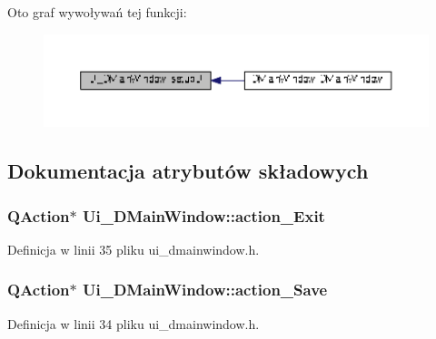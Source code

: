 Oto graf wywoływań tej funkcji\+:
\nopagebreak
\begin{figure}[H]
\begin{center}
\leavevmode
\includegraphics[width=350pt]{class_ui___d_main_window_aa53f3a89bf520704a3e79037df2fd451_icgraph}
\end{center}
\end{figure}




\subsection{Dokumentacja atrybutów składowych}
\hypertarget{class_ui___d_main_window_a00e6b795743b676bdf3ed853e91f7029}{}
\subsubsection[{action\+\_\+\+Exit}]{\setlength{\rightskip}{0pt plus 5cm}Q\+Action$\ast$ Ui\+\_\+\+D\+Main\+Window\+::action\+\_\+\+Exit}\label{class_ui___d_main_window_a00e6b795743b676bdf3ed853e91f7029}


Definicja w linii 35 pliku ui\+\_\+dmainwindow.\+h.

\hypertarget{class_ui___d_main_window_a7ab98279e07bdd724a091ea06012c87b}{}
\subsubsection[{action\+\_\+\+Save}]{\setlength{\rightskip}{0pt plus 5cm}Q\+Action$\ast$ Ui\+\_\+\+D\+Main\+Window\+::action\+\_\+\+Save}\label{class_ui___d_main_window_a7ab98279e07bdd724a091ea06012c87b}


Definicja w linii 34 pliku ui\+\_\+dmainwindow.\+h.

\hypertarget{class_ui___d_main_window_ae1fa62a4d27fa0f4a5c63c7c60cfdad2}{}
